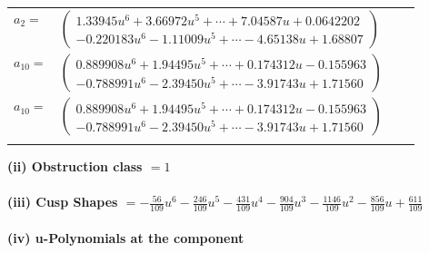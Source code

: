\documentclass[1p]{elsarticle_modified}
\theoremstyle{definition}
\begin{document}
\begin{tabular}{m{7pt} m{180pt} m{7pt} m{180pt} }
\flushright $a_{2}=$&$\begin{pmatrix}1.33945 u^{6}+3.66972 u^{5}+\cdots+7.04587 u+0.0642202\\-0.220183 u^{6}-1.11009 u^{5}+\cdots-4.65138 u+1.68807\end{pmatrix}$ \\
\flushright $a_{10}=$&$\begin{pmatrix}0.889908 u^{6}+1.94495 u^{5}+\cdots+0.174312 u-0.155963\\-0.788991 u^{6}-2.39450 u^{5}+\cdots-3.91743 u+1.71560\end{pmatrix}$\\ \flushright $a_{10}=$&$\begin{pmatrix}0.889908 u^{6}+1.94495 u^{5}+\cdots+0.174312 u-0.155963\\-0.788991 u^{6}-2.39450 u^{5}+\cdots-3.91743 u+1.71560\end{pmatrix}$\\&\end{tabular}
\flushleft \textbf{(ii) Obstruction class $= 1$}\\~\\
\flushleft \textbf{(iii) Cusp Shapes $= -\frac{56}{109} u^6-\frac{246}{109} u^5-\frac{431}{109} u^4-\frac{904}{109} u^3-\frac{1146}{109} u^2-\frac{856}{109} u+\frac{611}{109}$}\\~\\
\newpage\renewcommand{\arraystretch}{1}
\flushleft \textbf{(iv) u-Polynomials at the component}\newline \\
\end{document}
